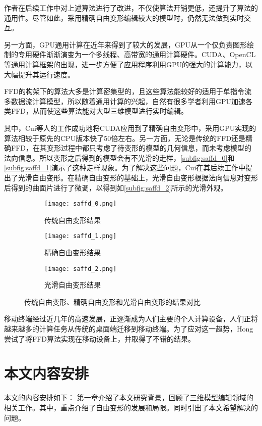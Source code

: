 作者在后续工作\cite{Feng00, Feng02}中对上述算法进行了改进，不仅使算法开销更低，还提升了算法的通用性。尽管如此，采用精确自由变形编辑较大的模型时，仍然无法做到实时交互。

另一方面，GPU通用计算在近年来得到了较大的发展，GPU从一个仅负责图形绘制的专用硬件渐渐演变为一个多线程、高带宽的通用计算硬件。CUDA、OpenCL等通用计算框架的出现，进一步方便了应用程序利用GPU的强大的计算能力，以大幅提升其运行速度。

FFD的构架下的算法大多是计算密集型的，且这些算法能较好的适用于单指令流多数据流计算模型，所以随着通用计算的兴起，自然有很多学者利用GPU加速各类FFD\cite{chua2000, modat2010}，从而使这些算法能对大型三维模型进行实时编辑。

其中，Cui等人\cite{Cui13}的工作成功地将CUDA应用到了精确自由变形中，采用GPU实现的算法相较于原先的CPU版本快了50倍左右。另一方面，无论是传统的FFD还是精确FFD，在其变形过程中都只考虑了待变形的模型的几何信息，而未考虑模型的法向信息。所以变形之后得到的模型会有不光滑的走样，\autoref{subfig:saffd_0}和\autoref{subfig:saffd_1}演示了这种走样现象。为了解决这些问题，Cui在其后续工作\cite{Cui15}中提出了光滑自由变形。在精确自由变形的基础上，光滑自由变形根据法向信息对变形后得到的曲面片进行了微调，以得到如\autoref{subfig:saffd_2}所示的光滑外观。

\begin{figure}[htbp]
	\centering
	\begin{subfigure}[b]{.3\textwidth}
		\centering
		\texttt{[image: saffd\_0.png]}
		\caption{传统自由变形结果}\label{subfig:saffd_0}
	\end{subfigure}
	\quad
	\begin{subfigure}[b]{.3\textwidth}
		\centering
		\texttt{[image: saffd\_1.png]}
		\caption{精确自由变形结果}\label{subfig:saffd_1}
	\end{subfigure}
	\quad
	\begin{subfigure}[b]{.3\textwidth}
		\centering
		\texttt{[image: saffd\_2.png]}
		\caption{光滑自由变形结果}\label{subfig:saffd_2}
	\end{subfigure}
    \caption{传统自由变形、精确自由变形和光滑自由变形的结果对比}\label{fig:sample_problem_saffd}
\end{figure}

移动终端经过近几年的高速发展，正逐渐成为人们主要的个人计算设备，人们正将越来越多的计算任务从传统的桌面端迁移到移动终端。为了应对这一趋势，Hong\cite{hong2013}尝试了将FFD算法实现在移动设备上，并取得了不错的结果。


\section{本文内容安排}
本文的内容安排如下：
第一章介绍了本文研究背景，回顾了三维模型编辑领域的相关工作。其中，重点介绍了自由变形的发展和局限。同时引出了本文希望解决的问题。

